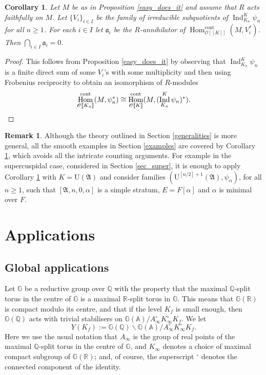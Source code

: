\documentclass[11pt]{article}
\let\mathcal\mathscr
\newtheorem{cor}[prop]{Corollary}
\theoremstyle{definition}
\newtheorem{remark}[prop]{Remark}
\DeclareMathOperator{\Hom}{Hom}
\DeclareMathOperator{\Ind}{Ind}
\newcommand{\br}[1]{[\![#1]\!]}
\newcommand{\Aa}{\mathfrak A}
\newcommand{\cO}{\mathcal{O}}
\newcommand{\cont}{\mathrm{cont}}
\newcommand{\UU}{\mathrm U}
\begin{document}
\begin{cor}\label{easy} Let
$M$ be as in Proposition \ref{easy_does_it} and assume that $R$ acts faithfully on $M$. Let $\{ V_i\}_{i\in I}$ be the family of irreducible subquotients of $\Ind_{K_n}^K \psi_n$ for all $n\ge 1$. For each $i\in I$ let $\mathfrak a_i$ be the $R$-annihilator of
$\Hom_{\cO\br{K}}^{\cont}(M, V_i^*)$. Then $\bigcap_{i\in I} \mathfrak a _i=0$.
\end{cor}

\begin{proof} This follows from Proposition \ref{easy_does_it} by observing that $\Ind_{K_n}^K \psi_n$ is a finite direct
sum of some $V_i$'s with some multiplicity and then using Frobenius reciprocity to obtain an isomorphism of $R$-modules
\[
\Hom^{\cont}_{\cO\br{K_n}}(M, \psi_n^*)\cong \Hom_{\cO\br{K}}^{\cont}(M, (\Ind_{K_n}^K \psi_n)^*).\qedhere
\]
\end{proof}

\begin{remark} Although the theory outlined in Section \ref{generalities} is more general,
all the smooth examples in Section \ref{examples} are covered by Corollary \ref{easy},
which avoids all the intricate counting arguments. For example in the supercuspidal case,
considered in Section \ref{sec_super}, it is enough to apply Corollary \ref{easy} with $K=\UU(\Aa)$ and
consider families $(\UU^{[n/2]+1}(\Aa), \psi_{\alpha})$, for all $n\ge 1$, such that $[\Aa, n, 0, \alpha]$
is a simple stratum, $E=F[\alpha]$ and $\alpha$ is minimal over $F$.
\end{remark}

\section{Applications}\label{sec_appl}

\subsection{Global applications}\label{global}

Let $\mathbb G$ be a reductive group over $\mathbb Q$ with the property
that the maximal $\mathbb Q$-split torus in the centre
of $\mathbb G$ is a maximal $\mathbb R$-split torus in $\mathbb G$.
This means that $\mathbb G(\mathbb R)$ is compact modulo its centre,
and that if the level $K_f$ is small enough, then
$\mathbb G(\mathbb Q)$ acts with trivial stabilisers
on $\mathbb G(\mathbb A)/A_{\infty}^{\circ} K_{\infty}^{\circ} K_f.$ We
let
\[
Y(K_f):= \mathbb G(\mathbb Q)\backslash\mathbb G(\mathbb A)/A_{\infty}^{\circ} K_{\infty}^{\circ} K_f.
\]
Here we use the usual notation that $A_{\infty}$ is the group
of real points of the maximal $\mathbb Q$\nobreakdash-split torus in the
centre of $\mathbb G$, and $K_{\infty}$ denotes
a choice of maximal compact subgroup of $\mathbb G(\mathbb R)$;
and, of course, the superscript ${}^{\circ}$ denotes the connected
component of the identity.
\end{document}
